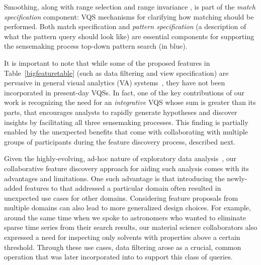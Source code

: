  Smoothing, along with range selection and range invariance , is part of the \emph{match specification} component: VQS mechanisms for clarifying how matching should be performed. Both match specification and \emph{pattern specification} (a description of what the pattern query should look like) are essential components for supporting the sensemaking process top-down pattern search (in blue).%
 \par It is important to note that while some of the proposed features in Table~\ref{bigfeaturetable} (such as data filtering and view specification) are pervasive in general visual analytics (VA) systems~\cite{Heer2012,Amar2005}, they have not been incorporated in present-day VQSs. In fact, one of the key contributions of our work is recognizing the need for an \emph{integrative} VQS whose sum is greater than its parts, that encourages analysts to rapidly generate hypotheses and discover insights by facilitating all three sensemaking processes. This finding is partially enabled by the unexpected benefits that come with collaborating with multiple groups of participants during the feature discovery process, described next.
 \par Given the highly-evolving, ad-hoc nature of exploratory data analysis~\cite{Keim2006,Tukey1970}, our collaborative feature discovery approach for aiding such analysis comes with its advantages and limitations. One such advantage is that introducing the newly-added features to \zvpp that addressed a particular domain often resulted in unexpected use cases for other domains. Considering feature proposals from multiple domains can also lead to more generalized design choices. For example, around the same time when we spoke to astronomers who wanted to eliminate sparse time series from their search results, our material science collaborators also expressed a need for inspecting only solvents with properties above a certain threshold. Through these use cases, data filtering arose as a crucial, common operation that was later incorporated into \zvpp to support this class of queries. %
